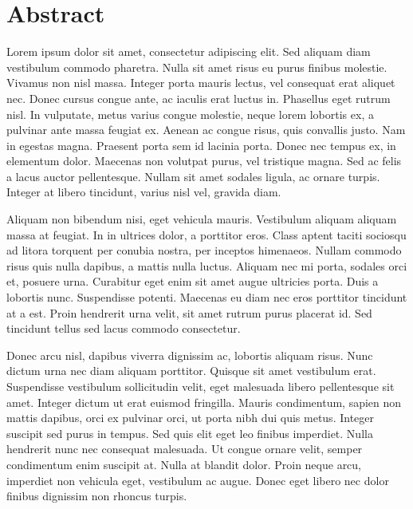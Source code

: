 
\chapter*{Abstract} %

Lorem ipsum dolor sit amet, consectetur adipiscing elit. Sed aliquam diam vestibulum commodo pharetra. Nulla sit amet risus eu purus finibus molestie. Vivamus non nisl massa. Integer porta mauris lectus, vel consequat erat aliquet nec. Donec cursus congue ante, ac iaculis erat luctus in. Phasellus eget rutrum nisl. In vulputate, metus varius congue molestie, neque lorem lobortis ex, a pulvinar ante massa feugiat ex. Aenean ac congue risus, quis convallis justo. Nam in egestas magna. Praesent porta sem id lacinia porta. Donec nec tempus ex, in elementum dolor. Maecenas non volutpat purus, vel tristique magna. Sed ac felis a lacus auctor pellentesque. Nullam sit amet sodales ligula, ac ornare turpis. Integer at libero tincidunt, varius nisl vel, gravida diam.

Aliquam non bibendum nisi, eget vehicula mauris. Vestibulum aliquam aliquam massa at feugiat. In in ultrices dolor, a porttitor eros. Class aptent taciti sociosqu ad litora torquent per conubia nostra, per inceptos himenaeos. Nullam commodo risus quis nulla dapibus, a mattis nulla luctus. Aliquam nec mi porta, sodales orci et, posuere urna. Curabitur eget enim sit amet augue ultricies porta. Duis a lobortis nunc. Suspendisse potenti. Maecenas eu diam nec eros porttitor tincidunt at a est. Proin hendrerit urna velit, sit amet rutrum purus placerat id. Sed tincidunt tellus sed lacus commodo consectetur.

Donec arcu nisl, dapibus viverra dignissim ac, lobortis aliquam risus. Nunc dictum urna nec diam aliquam porttitor. Quisque sit amet vestibulum erat. Suspendisse vestibulum sollicitudin velit, eget malesuada libero pellentesque sit amet. Integer dictum ut erat euismod fringilla. Mauris condimentum, sapien non mattis dapibus, orci ex pulvinar orci, ut porta nibh dui quis metus. Integer suscipit sed purus in tempus. Sed quis elit eget leo finibus imperdiet. Nulla hendrerit nunc nec consequat malesuada. Ut congue ornare velit, semper condimentum enim suscipit at. Nulla at blandit dolor. Proin neque arcu, imperdiet non vehicula eget, vestibulum ac augue. Donec eget libero nec dolor finibus dignissim non rhoncus turpis.

